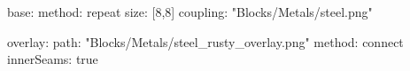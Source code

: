 base:
  method: repeat
  size: [8,8]
  coupling: "Blocks/Metals/steel.png"

overlay:
  path: "Blocks/Metals/steel_rusty_overlay.png"
  method: connect
  innerSeams: true